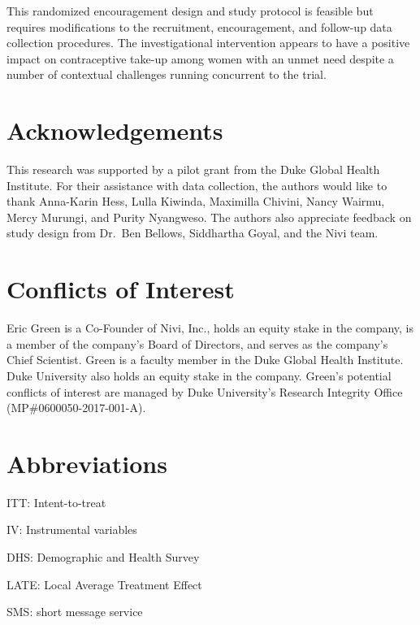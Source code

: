 \documentclass[man]{apa6}
\theoremstyle{definition}
\theoremstyle{definition}
\theoremstyle{definition}
\theoremstyle{remark}
\begin{document}
This randomized encouragement design and study protocol is feasible but
requires modifications to the recruitment, encouragement, and follow-up
data collection procedures. The investigational intervention appears to
have a positive impact on contraceptive take-up among women with an
unmet need despite a number of contextual challenges running concurrent
to the trial.

\newpage

\hypertarget{acknowledgements}{%
\section{Acknowledgements}\label{acknowledgements}}

This research was supported by a pilot grant from the Duke Global Health
Institute. For their assistance with data collection, the authors would
like to thank Anna-Karin Hess, Lulla Kiwinda, Maximilla Chivini, Nancy
Wairmu, Mercy Murungi, and Purity Nyangweso. The authors also appreciate
feedback on study design from Dr.~Ben Bellows, Siddhartha Goyal, and the
Nivi team.

\hypertarget{conflicts-of-interest}{%
\section{Conflicts of Interest}\label{conflicts-of-interest}}

Eric Green is a Co-Founder of Nivi, Inc., holds an equity stake in the
company, is a member of the company's Board of Directors, and serves as
the company's Chief Scientist. Green is a faculty member in the Duke
Global Health Institute. Duke University also holds an equity stake in
the company. Green's potential conflicts of interest are managed by Duke
University's Research Integrity Office (MP\#0600050-2017-001-A).

\hypertarget{abbreviations}{%
\section{Abbreviations}\label{abbreviations}}

ITT: Intent-to-treat

IV: Instrumental variables

DHS: Demographic and Health Survey

LATE: Local Average Treatment Effect

SMS: short message service

\newpage
\end{document}
